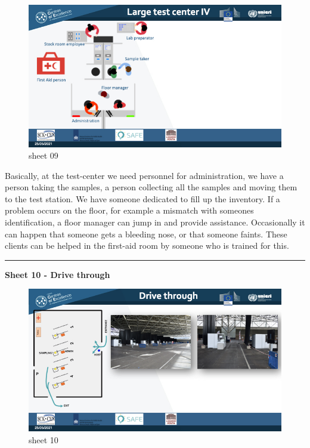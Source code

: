 \documentclass[
]{book}
\begin{document}
\begin{figure}
\centering
\includegraphics{images/m05/m05_Workflow_final.009.jpeg}
\caption{sheet 09}
\end{figure}

Basically, at the test-center we need personnel for administration, we
have a person taking the samples, a person collecting all the samples
and moving them to the test station. We have someone dedicated to fill
up the inventory. If a problem occurs on the floor, for example a
mismatch with someones identification, a floor manager can jump in and
provide assistance. Occasionally it can happen that someone gets a
bleeding nose, or that someone faints. These clients can be helped in
the first-aid room by someone who is trained for this.

\begin{center}\rule{0.5\linewidth}{0.5pt}\end{center}

\textbf{Sheet 10 - Drive through}

\begin{figure}
\centering
\includegraphics{images/m05/m05_Workflow_final.010.jpeg}
\caption{sheet 10}
\end{figure}
\end{document}
